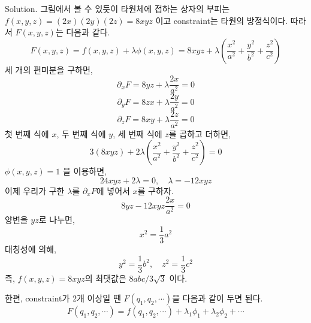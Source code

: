 \documentclass[a4paper,12pt]{article}
\begin{document}
Solution. 그림에서 볼 수 있듯이 타원체에 접하는 상자의 부피는 $f(x,y,z)=(2x)(2y)(2z)=8xyz$ 이고 constraint는 타원의 방정식이다. 따라서 $F(x,y,z)$는 다음과 같다.
$$F(x,y,z)=f(x,y,z)+\lambda\phi(x,y,z)=8xyz+\lambda\left(\frac{x^2}{a^2}+\frac{y^2}{b^2}+\frac{z^2}{c^2}\right) $$
세 개의 편미분을 구하면,
$$\partial_x F=8yz+\lambda\frac{2x}{a^2}=0$$
$$\partial_y F=8zx+\lambda\frac{2y}{a^2}=0$$
$$\partial_z F=8xy+\lambda\frac{2z}{a^2}=0$$
첫 번째 식에 $x$, 두 번째 식에 $y$, 세 번째 식에 $z$를 곱하고 더하면,
$$3(8xyz)+2\lambda\left(\frac{x^2}{a^2}+\frac{y^2}{b^2}+\frac{z^2}{c^2} \right)=0 $$
$\phi(x,y,z)=1$ 을 이용하면,
$$24xyz+2\lambda=0 ,\quad \lambda=-12xyz$$
이제 우리가 구한 $\lambda$를 $\partial_xF$에 넣어서 $x$를 구하자.
$$8yz-12xyz\frac{2x}{a^2}=0$$
양변을 $yz$로 나누면, 
$$x^2=\frac{1}{3}a^2$$
대칭성에 의해, 
$$y^2=\frac{1}{3}b^2,\quad z^2=\frac{1}{3}c^2$$
즉, $f(x,y,z)=8xyz$의 최댓값은 $8abc/{3\sqrt{3}}$ 이다.\\
\begin{flushleft}
	한편, constraint가 2개 이상일 땐 $F(q_1,q_2,\cdots)$을 다음과 같이 두면 된다. 
	$$F(q_1,q_2,\cdots)=f(q_1,q_2,\cdots)+\lambda_1\phi_1+\lambda_2\phi_2+\cdots$$
\end{flushleft}
\end{document}
